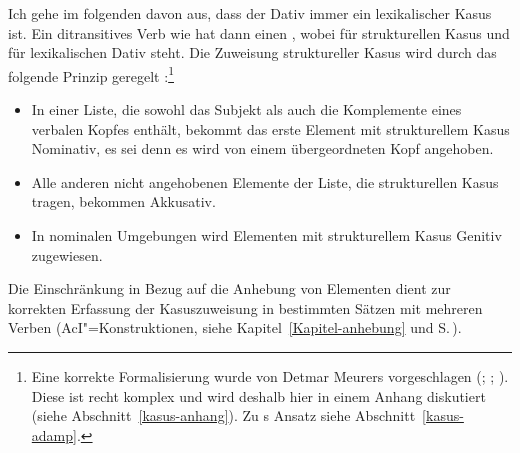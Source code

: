 Ich gehe im folgenden davon aus, dass der Dativ immer ein lexikalischer Kasus ist. 
Ein ditransitives Verb wie  hat dann einen \compsw {},
wobei  für strukturellen Kasus und  für lexikalischen Dativ steht.
Die Zuweisung struktureller Kasus wird durch das folgende Prinzip geregelt \parencites{Prze99}{Meurers99b}[Kapitel~10.4.1.4]{Meurers2000b}{MdK2001a}[Kapitel~7.2]{MuellerGermanic}:\footnote{
  Eine korrekte Formalisierung wurde von Detmar Meurers
  vorgeschlagen (\citealp{Meurers99b}; \citealp{MdK2001a}; \citealp[Kapitel~10.4.1.4]{Meurers2000b}).
  Diese ist recht komplex und wird deshalb hier in einem Anhang diskutiert (siehe Abschnitt~\ref{kasus-anhang}).
  Zu \prz{}s Ansatz siehe Abschnitt~\ref{kasus-adamp}.%
}
\begin{prinzip-break}[Kasusprinzip]
\label{case-p}
\begin{itemize}
\item In einer Liste, die sowohl das Subjekt als auch die Komplemente eines verbalen Kopfes
      enthält, bekommt das erste Element mit strukturellem Kasus 
      Nominativ, es sei denn es wird von einem übergeordneten Kopf angehoben.
\item Alle anderen nicht angehobenen Elemente der Liste, die strukturellen Kasus tragen, bekommen Akkusativ.
\item In nominalen Umgebungen wird Elementen mit strukturellem Kasus Genitiv zugewiesen.
\end{itemize}
\end{prinzip-break}
Die Einschränkung in Bezug auf die Anhebung von Elementen dient zur korrekten Erfassung der
Kasuszuweisung in bestimmten Sätzen mit mehreren Verben (\zb AcI"=Konstruktionen, siehe
Kapitel~\ref{Kapitel-anhebung} und S.\,\pageref{page-aci-kasus}).

